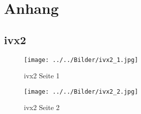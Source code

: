 
%
\appendix{}
\chapter{Anhang}

\section{ivx2} 
\begin{figure}[H]
	\begin{center}
		\texttt{[image: ../../Bilder/ivx2\_1.jpg]}
	\end{center}
	\caption{ivx2 Seite 1} %
	\label{ivx2 Seite 1}			%
\end{figure}

\begin{figure}[H]
	\begin{center}
		\texttt{[image: ../../Bilder/ivx2\_2.jpg]}
	\end{center}
	\caption{ivx2 Seite 2}
	\label{ivx2 Seite 2}
\end{figure}





